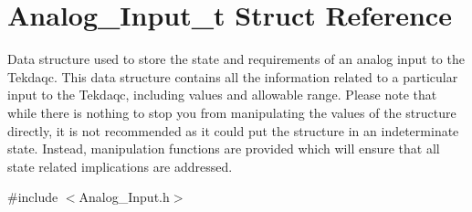 \hypertarget{struct_analog___input__t}{\section{Analog\-\_\-\-Input\-\_\-t Struct Reference}
\label{struct_analog___input__t}
}


Data structure used to store the state and requirements of an analog input to the Tekdaqc. This data structure contains all the information related to a particular input to the Tekdaqc, including values and allowable range. Please note that while there is nothing to stop you from manipulating the values of the structure directly, it is not recommended as it could put the structure in an indeterminate state. Instead, manipulation functions are provided which will ensure that all state related implications are addressed.  




{\ttfamily \#include $<$Analog\-\_\-\-Input.\-h$>$}

